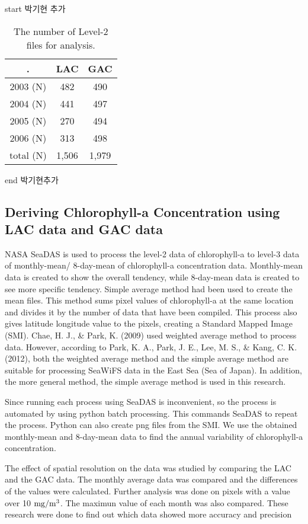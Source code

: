 start 박기현 추가
 \begin{table}[h]
	\caption{The number of Level-2 files for analysis.}
	\label{data_information}
	\centering
	\begin{tabular}{c | c | c }
		\hline \setlength{\arrayrulewidth}{3.5pt}. 
			& LAC  & GAC \\ \hline
		2003 (N) & 482 & 490 \\ \hline
		2004 (N) & 441 & 497 \\ \hline
		2005 (N) & 270 & 494 \\ \hline
		2006 (N) & 313 & 498 \\ \hline
		total (N) & 1,506 & 1,979 \\ \hline
	\end{tabular}
\end{table}
end 박기현추가

\hfill \break
\hfill \break


 \subsection{Deriving Chlorophyll-a Concentration using LAC data and GAC data}
 
NASA SeaDAS is used to process the level-2 data of chlorophyll-a to level-3 data of monthly-mean/ 8-day-mean of chlorophyll-a concentration data. Monthly-mean data is created to show the overall tendency, while 8-day-mean data is created to see more specific tendency. Simple average method had been used to create the mean files. This method sums pixel values of chlorophyll-a at the same location and divides it by the number of data that have been compiled. This process also gives latitude longitude value to the pixels, creating a Standard Mapped Image (SMI). Chae, H. J., \& Park, K. (2009) used weighted average method to process data. However, according to Park, K. A., Park, J. E., Lee, M. S., \& Kang, C. K. (2012), both the weighted average method and the simple average method are suitable for processing SeaWiFS data in the East Sea (Sea of Japan). In addition, the more general method, the simple average method is used in this research.
  
 Since running each process using SeaDAS is inconvenient, so the process is automated by using python batch processing. This commands SeaDAS to repeat the process. Python can also create png files from the SMI. We use the obtained monthly-mean and 8-day-mean data to find the annual variability of chlorophyll-a concentration.
 
 The effect of spatial resolution on the data was studied by comparing the LAC and the GAC data. The monthly average data was compared and the differences of the values were calculated. Further analysis was done on pixels with a value over 10 $\rm mg/m^3$. The maximun value of each month was also compared. These research were done to find out which data showed more accuracy and precision
 
 